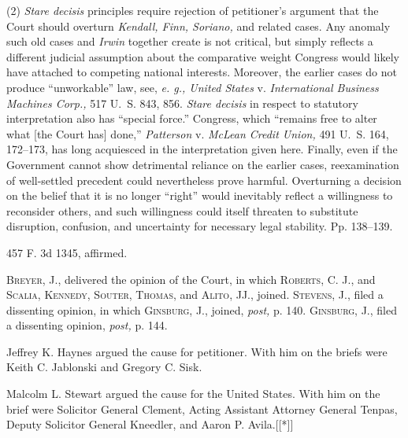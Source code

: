  (2) \emph{Stare decisis} principles require rejection of petitioner's argument that the Court should overturn \emph{Kendall, Finn, Soriano,} and related cases. Any anomaly such old cases and \emph{Irwin} together create is not critical, but simply reflects a different judicial assumption about the comparative weight Congress would likely have attached to competing national interests. Moreover, the earlier cases do not produce ``unworkable'' law, see, \emph{e. g., United States} v. \emph{International Business Machines Corp.,} 517 U.~S. 843, 856. \emph{Stare decisis} in respect to statutory interpretation also has ``special force.'' Congress, which ``remains free to alter what [the Court has] done,'' \emph{Patterson} v. \emph{McLean Credit Union,} 491 U.~S. 164, 172--173, has long acquiesced in the interpretation given here. Finally, even if the Government cannot show detrimental reliance on the earlier cases, reexamination of well-settled precedent could nevertheless prove harmful. Overturning a decision on the belief that it is no longer ``right'' would inevitably reflect a willingness to reconsider others, and such willingness could itself threaten to substitute disruption, confusion, and uncertainty for necessary legal stability. Pp. 138--139.

457 F. 3d 1345, affirmed.

  \textsc{Breyer,} J., delivered the opinion of the Court, in which \textsc{Roberts,} C. J., and \textsc{Scalia, Kennedy, Souter, Thomas,} and \textsc{Alito,} JJ., joined. \textsc{Stevens,} J., filed a dissenting opinion, in which \textsc{Ginsburg,} J., joined, \emph{post,} p. 140. \textsc{Ginsburg,} J., filed a dissenting opinion, \emph{post,} p. 144.

  Jeffrey K. Haynes argued the cause for petitioner. With him on the briefs were Keith C. Jablonski and Gregory C. Sisk.

  Malcolm L. Stewart argued the cause for the United States. With him on the brief were Solicitor General \newpage  Clement, Acting Assistant Attorney General Tenpas, Deputy Solicitor General Kneedler, and Aaron P. Avila.[[*]]


